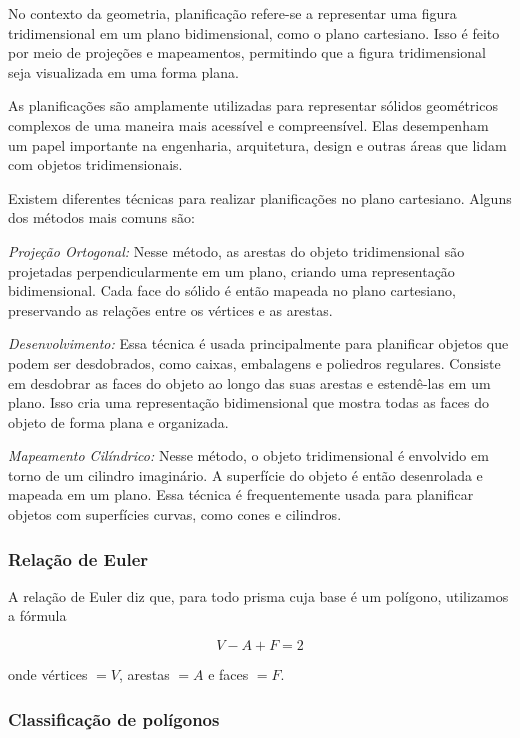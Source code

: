 {No contexto da geometria, planificação refere-se a representar uma
figura tridimensional em um plano bidimensional, como o plano
cartesiano. Isso é feito por meio de projeções e mapeamentos, permitindo
que a figura tridimensional seja visualizada em uma forma plana.

As planificações são amplamente utilizadas para representar sólidos
geométricos complexos de uma maneira mais acessível e compreensível.
Elas desempenham um papel importante na engenharia, arquitetura, design
e outras áreas que lidam com objetos tridimensionais.

Existem diferentes técnicas para realizar planificações no plano
cartesiano. Alguns dos métodos mais comuns são:

\medskip \noindent  \textit{Projeção Ortogonal:} Nesse método, as arestas do objeto tridimensional
são projetadas perpendicularmente em um plano, criando uma representação
bidimensional. Cada face do sólido é então mapeada no plano cartesiano,
preservando as relações entre os vértices e as arestas.

 \medskip \noindent  \textit{Desenvolvimento:} Essa técnica é usada principalmente para planificar
objetos que podem ser desdobrados, como caixas, embalagens e poliedros
regulares. Consiste em desdobrar as faces do objeto ao longo das suas
arestas e estendê-las em um plano. Isso cria uma representação
bidimensional que mostra todas as faces do objeto de forma plana e
organizada.

\medskip \noindent  \textit{Mapeamento Cilíndrico:} Nesse método, o objeto tridimensional é envolvido
em torno de um cilindro imaginário. A superfície do objeto é então
desenrolada e mapeada em um plano. Essa técnica é frequentemente usada
para planificar objetos com superfícies curvas, como cones e cilindros.

\subsubsection{Relação de Euler}

A relação de Euler diz que, para todo prisma cuja base é um polígono,
utilizamos a fórmula

$$V - A + F = 2$$

onde vértices $= V$, arestas $= A$ e faces $= F$.

\subsubsection{Classificação de polígonos}

}
